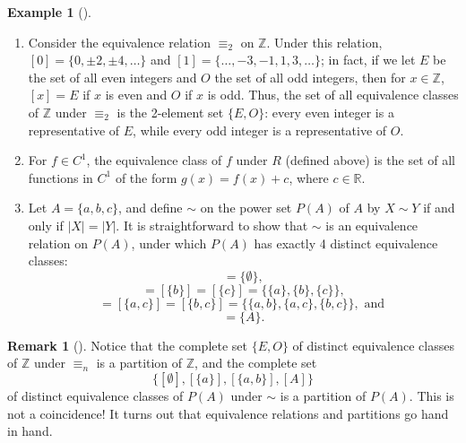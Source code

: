 \documentclass[10pt,]{book}
\theoremstyle{plain}
\theoremstyle{definition}
\theoremstyle{definition}
\newtheorem{remark}[theorem]{Remark}
\theoremstyle{definition}
\newtheorem{example}[theorem]{Example}
\theoremstyle{definition}
\numberwithin{equation}{section}
\def\Z{\mathbb{Z}}
\def\R{\mathbb{R}}
\begin{document}
\begin{example}[]\label{example-67}
\leavevmode%
\begin{enumerate}
\item\hypertarget{li-402}{}Consider the equivalence relation \(\equiv_2\) on \(\Z\).  Under this relation, \([0]=\{0,\pm 2, \pm 4, \ldots\}\) and \([1]=\{\ldots, -3, -1, 1, 3, \ldots\}\); in fact, if we let \(E\) be the set of all even integers and \(O\) the set of all odd integers, then for \(x\in \Z\), \([x]=E\) if \(x\) is even and \(O\) if \(x\) is odd. Thus, the set of all equivalence classes of \(\Z\) under \(\equiv_2\) is the 2-element set \(\{E,O\}\): every even integer is a representative of \(E\), while every odd integer is a representative of \(O\).%
\item\hypertarget{li-403}{}For \(f\in C^1\), the equivalence class of \(f\) under \(R\) (defined above) is the set of all functions in \(C^1\) of the form \(g(x)=f(x)+c\), where \(c\in \R\).%
\item\hypertarget{li-404}{}Let \(A=\{a,b,c\}\), and define \(\sim\) on the power set \(P(A)\) of \(A\) by \(X\sim Y\) if and only if \(|X|=|Y|\). It is straightforward to show that \(\sim\) is an equivalence relation on \(P(A)\), under which \(P(A)\) has exactly 4 distinct equivalence classes:%
\begin{equation*}
[\emptyset]=\{\emptyset\},
\end{equation*}
%
\begin{equation*}
[\{a\}]=[\{b\}]=[\{c\}]=\{\{a\},\{b\}, \{c\}\},
\end{equation*}
%
\begin{equation*}
[\{a,b\}]=[\{a,c\}]=[\{b,c\}]=\{\{a,b\},\{a,c\},\{b,c\}\}, \text{ and }
\end{equation*}
%
\begin{equation*}
[A]=\{A\}.
\end{equation*}
%
\end{enumerate}
%
\end{example}
\begin{remark}[]\label{remark-37}
Notice that the complete set \(\{E,O\}\) of distinct equivalence classes of \(\Z\) under \(\equiv_n\) is a partition of \(\Z\), and the complete set%
\begin{equation*}
\{[\emptyset],[\{a\}],[\{a,b\}],[A]\}
\end{equation*}
of distinct equivalence classes of \(P(A)\) under \(\sim\) is a partition of \(P(A)\). This is not a coincidence! It turns out that equivalence relations and partitions go hand in hand.%
\end{remark}
\end{document}
